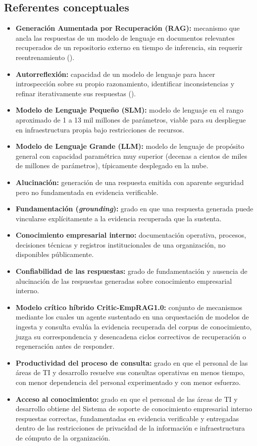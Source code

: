 \subsection{Referentes conceptuales}

\begin{itemize}
    \item \textbf{Generación Aumentada por Recuperación (RAG):} mecanismo que ancla las respuestas de un modelo de lenguaje en documentos relevantes recuperados de un repositorio externo en tiempo de inferencia, sin requerir reentrenamiento (\cite{Lewis2020rag}).
    \item \textbf{Autorreflexión:} capacidad de un modelo de lenguaje para hacer introspección sobre su propio razonamiento, identificar inconsistencias y refinar iterativamente sus respuestas (\cite{Shinn2023_Reflexion}).
    \item \textbf{Modelo de Lenguaje Pequeño (SLM):} modelo de lenguaje en el rango aproximado de 1 a 13 mil millones de parámetros, viable para su despliegue en infraestructura propia bajo restricciones de recursos.
    \item \textbf{Modelo de Lenguaje Grande (LLM):} modelo de lenguaje de propósito general con capacidad paramétrica muy superior (decenas a cientos de miles de millones de parámetros), típicamente desplegado en la nube.
    \item \textbf{Alucinación:} generación de una respuesta emitida con aparente seguridad pero no fundamentada en evidencia verificable.
    \item \textbf{Fundamentación (\textit{grounding}):} grado en que una respuesta generada puede vincularse explícitamente a la evidencia recuperada que la sustenta.
    \item \textbf{Conocimiento empresarial interno:} documentación operativa, procesos, decisiones técnicas y registros institucionales de una organización, no disponibles públicamente.
    \item \textbf{Confiabilidad de las respuestas:} grado de fundamentación y ausencia de alucinación de las respuestas generadas sobre conocimiento empresarial interno.
    \item \textbf{Modelo crítico híbrido Critic-EmpRAG1.0:} conjunto de mecanismos mediante los cuales un agente sustentado en una orquestación de modelos de ingesta y consulta evalúa la evidencia recuperada del corpus de conocimiento, juzga su correspondencia y desencadena ciclos correctivos de recuperación o regeneración antes de responder.
    \item \textbf{Productividad del proceso de consulta:} grado en que el personal de las áreas de TI y desarrollo resuelve sus consultas operativas en menos tiempo, con menor dependencia del personal experimentado y con menor esfuerzo.
    \item \textbf{Acceso al conocimiento:} grado en que el personal de las áreas de TI y desarrollo obtiene del Sistema de soporte de conocimiento empresarial interno respuestas correctas, fundamentadas en evidencia verificable y entregadas dentro de las restricciones de privacidad de la información e infraestructura de cómputo de la organización.
\end{itemize}

